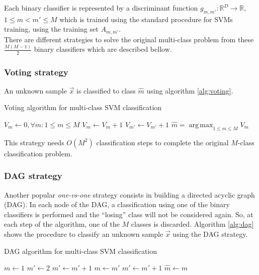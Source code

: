 \documentclass[10pt,a4paper]{article}
\DeclareMathOperator*{\argmax}{arg\,max}
\begin{document}
Each binary classifier is represented by a discriminant function $g_{m,m'} : \mathbb{R}^D \rightarrow \mathbb{R}$, $1 \leq m < m' \leq M$ which is trained using the standard procedure for SVMs training, using the training set $A_{m,m'}$.\\

There are different strategies to solve the original multi-class problem from these $\frac{M (M-1)}{2}$ binary classifiers which are described bellow.

\subsubsection{Voting strategy}
An unknown sample $\vec{x}$ is classified to class $\hat{m}$ using algorithm \ref{alg:voting}.\\

\begin{algorithm}[h]
\caption{Voting algorithm for multi-class SVM classification}
\label{alg:voting}
\begin{algorithmic}
\State $V_m \leftarrow 0, \forall m : 1 \leq m \leq M$
			\State $V_m \leftarrow V_m + 1$
		\Else
			\State $V_{m'} \leftarrow V_{m'} + 1$
		\EndIf
	\EndFor
\EndFor
\State $\hat{m} = \argmax_{1 \leq m \leq M} V_m$
\end{algorithmic}
\end{algorithm}

This strategy needs $O(M^2)$ classification steps to complete the original $M$-class classification problem.

\subsubsection{DAG strategy}
Another popular \emph{one-vs-one} strategy consists in building a directed acyclic graph (DAG)\cite{platt2000large}. In each node of the DAG, a classification using one of the binary classifiers is performed and the ``losing'' class will not be considered again. So, at each step of the algorithm, one of the $M$ classes is discarded. Algorithm \ref{alg:dag} shows the procedure to classify an unknown sample $\vec{x}$ using the DAG strategy.\\

\begin{algorithm}[h]
\caption{DAG algorithm for multi-class SVM classification}
\label{alg:dag}
\begin{algorithmic}
\State $m \leftarrow 1$
\State $m' \leftarrow 2$
	\State $m' \leftarrow m' + 1$ 
\Else {}
	\State $m \leftarrow m'$
	\State $m' \leftarrow m' + 1$
\EndIf
\EndWhile
\State $\hat{m} \leftarrow m$
\end{algorithmic}
\end{algorithm}
\end{document}
